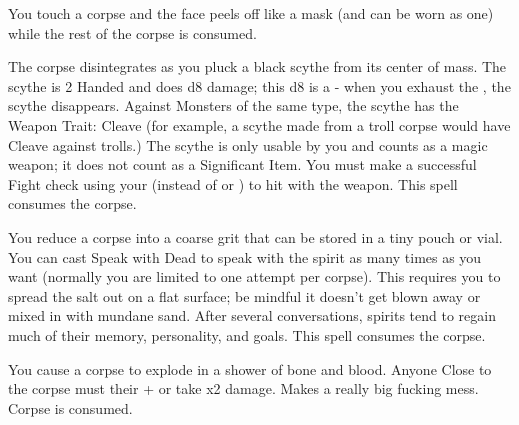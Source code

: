 {\NECRO[
  Name=Death Mask,
  Link=necromancy-death-mask,
  Paradigm=Death,
  Save=N,
  Duration=Permanent,
  Mod=+9,
  Keywords=None,
  Target=Close (touch) corpse
]


You touch a corpse and the face peels off like a mask (and can be worn as one) while the rest of the corpse is consumed.

\NECRO[
  Name=Death Scythe,
  Link=necromancy-death-scythe
  Paradigm=Death,
  Save=N,
  Duration=Until Exhausted,
  Mod=+3,
  Keywords=None,
  Target=Close (touch) corpse
]


The corpse disintegrates as you pluck a black scythe from its center of mass. The scythe is 2 Handed and does d8 damage; this d8 is a \UD - when you exhaust the \UD, the scythe disappears.  Against Monsters of the same type, the scythe has the Weapon Trait: Cleave (for example, a scythe made from a troll corpse would have Cleave against trolls.) The scythe is only usable by you and counts as a magic weapon; it does not count as a Significant Item. You must make a successful Fight check using your \FOC (instead of \VIG or \DEX) to hit with the weapon. This spell consumes the corpse.

\NECRO[
  Name=Essential Salt,
  Link=necromancy-essential-salt,
  Paradigm=Death,
  Save=N,
  Duration=Permanent,
  Mod=+9,
  Keywords=None,
  Target=Close (touch) corpse
]


You reduce a corpse into a coarse grit that can be stored in a tiny pouch or vial. You can cast Speak with Dead to speak with the spirit as many times as you want (normally you are limited to one attempt per corpse). This requires you to spread the salt out on a flat surface; be mindful it doesn't get blown away or mixed in with mundane sand. After several conversations, spirits tend to regain much of their memory, personality, and goals. This spell consumes the corpse.

\NECRO[
  Name=Exploding Corpse,
  Link=necromancy-exploding-corpse,
  Paradigm=Death,
  Save=N,
  Duration=0,
  Mod=+9,
  Keywords=None,
  Target=Nearby Corpse
]

You cause a corpse to explode in a shower of bone and blood. Anyone Close to the corpse must \RO their \MD + \DEX or take \LVL x2 damage.  Makes a really big fucking mess.  Corpse is consumed.

\NECRO[
  Name=Eyes of the Dead,
  Link=necromancy-eyes-of-the-dead,
  Paradigm=Death,
  Save=N,
  Duration=Session,
  Mod=+9,
  Keywords=None,
  Target=Close (touch) corpse
]


}
